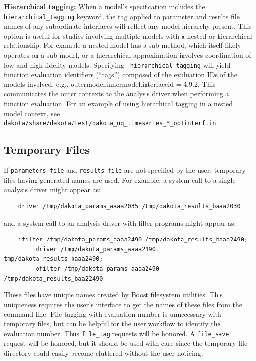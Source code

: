 \textbf{Hierarchical tagging:} When a model's specification includes
the {\tt hierarchical\_tagging} keyword, the tag applied to parameter
and results file names of any subordinate interfaces will reflect any
model hierarchy present.  This option is useful for studies involving
multiple models with a nested or hierarchical relationship.  For
example a nested model has a sub-method, which itself likely operates
on a sub-model, or a hierarchical approximation involves coordination
of low and high fidelity models.  Specifying {\tt
  hierarchical\_tagging} will yield function evaluation identifiers
(``tags'') composed of the evaluation IDs of the models involved,
e.g., outermodel.innermodel.interfaceid = 4.9.2.  This communicates
the outer contexts to the analysis driver when performing a function
evaluation.  For an example of using hierarhical tagging in a nested
model context, see {\tt
  dakota/share/dakota/test/dakota\_uq\_timeseries\_*\_optinterf.in}.

\subsection{Temporary Files}\label{interfaces:file:temporary}

If \texttt{parameters\_file} and \texttt{results\_file} are not
specified by the user, temporary files having generated names are
used.  For example, a system call to a single analysis driver might
appear as:
\begin{small}
\begin{verbatim}
    driver /tmp/dakota_params_aaaa2035 /tmp/dakota_results_baaa2030
\end{verbatim}
\end{small}

and a system call to an analysis driver with filter programs might appear as:
\begin{small}
\begin{verbatim}
    ifilter /tmp/dakota_params_aaaa2490 /tmp/dakota_results_baaa2490;
         driver /tmp/dakota_params_aaaa2490 tmp/dakota_results_baaa2490;
         ofilter /tmp/dakota_params_aaaa2490 /tmp/dakota_results_baa22490
\end{verbatim}
\end{small}

These files have unique names created by Boost filesystem
utilities. This uniqueness requires the user's interface to get the
names of these files from the command line. File tagging with
evaluation number is unnecessary with temporary files, but can be
helpful for the user workflow to identify the evaluation number.  Thus
\texttt{file\_tag} requests will be honored. A \texttt{file\_save}
request will be honored, but it should be used with care since the
temporary file directory could easily become cluttered without the
user noticing.

